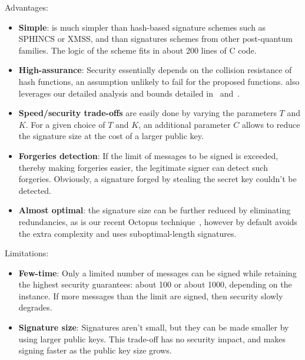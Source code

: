 Advantages:
\begin{itemize}

\item \textbf{Simple}: \gravity is much simpler than hash-based signature schemes such as SPHINCS or XMSS, and than signatures schemes from other post-quantum families. The logic of the scheme fits in about 200 lines of C code.

\item \textbf{High-assurance}: Security essentially depends on the collision resistance of hash functions, an assumption unlikely to fail for the proposed functions. \gravity also leverages our detailed analysis and bounds detailed in~\cite[\S4]{masters} and~\cite{subsetres}.

\item \textbf{Speed/security trade-offs} are easily done by varying the parameters $T$ and $K$. For a given choice of $T$ and $K$, an additional parameter $C$ allows to reduce the signature size at the cost of a larger public key.

\item \textbf{Forgeries detection}: If the limit of messages to be signed is exceeded, thereby making forgeries easier, the legitimate signer can detect such forgeries. Obviously, a signature forged by stealing the secret key couldn't be detected.

\item \textbf{Almost optimal}: the signature size can be further reduced by eliminating redundancies, as is our recent Octopus technique~\cite[\S5]{masters}, however by default \gravity avoids the extra complexity and uses suboptimal-length signatures.

\end{itemize}

Limitations:

\begin{itemize}

\item \textbf{Few-time}: Only a limited number of messages can be signed while retaining the highest security guarantees: about 100 or about 1000, depending on the instance. If more messages than the limit are signed, then security slowly degrades.

\item \textbf{Signature size}: Signatures aren't small, but they can be made smaller by using larger public keys. This trade-off has no security impact, and makes signing faster as the public key size grows.

\end{itemize}


